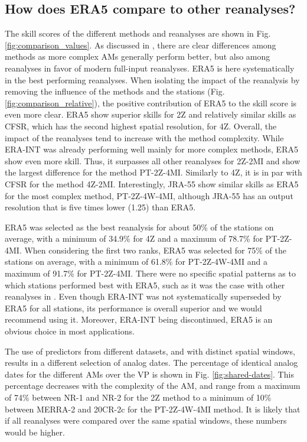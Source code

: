 \documentclass[alpha-refs]{wiley-article}
\begin{document}
\subsection{How does ERA5 compare to other reanalyses?}
\label{sec:results_skill}

The skill scores of the different methods and reanalyses are shown in Fig. \ref{fig:comparison_values}. As discussed in \citet{Horton2018b}, there are clear differences among methods as more complex AMs generally perform better, but also among reanalyses in favor of modern full-input reanalyses. ERA5 is here systematically in the best performing reanalyses. When isolating the impact of the reanalysis by removing the influence of the methods and the stations (Fig. \ref{fig:comparison_relative}), the positive contribution of ERA5 to the skill score is even more clear. ERA5 show superior skills for 2Z and relatively similar skills as CFSR, which has the second highest spatial resolution, for 4Z. Overall, the impact of the reanalyses tend to increase with the method complexity. While ERA-INT was already performing well mainly for more complex methods, ERA5 show even more skill. Thus, it surpasses all other reanalyses for 2Z-2MI and show the largest difference for the method PT-2Z-4MI. Similarly to 4Z, it is in par with CFSR for the method 4Z-2MI. Interestingly, JRA-55 show similar skills as ERA5 for the most complex method, PT-2Z-4W-4MI, although JRA-55 has an output resolution that is five times lower (1.25\degree) than ERA5.

ERA5 was selected as the best reanalysis for about 50\% of the stations on average, with a minimum of 34.9\% for 4Z and a maximum of 78.7\% for PT-2Z-4MI. When considering the first two ranks, ERA5 was selected for 75\% of the stations on average, with a minimum of 61.8\% for PT-2Z-4W-4MI and a maximum of 91.7\% for PT-2Z-4MI. There were no specific spatial patterns as to which stations performed best with ERA5, such as it was the case with other reanalyses in \citet{Horton2018b}. Even though ERA-INT was not systematically superseded by ERA5 for all stations, its performance is overall superior and we would recommend using it. Moreover, ERA-INT being discontinued, ERA5 is an obvious choice in most applications.

The use of predictors from different datasets, and with distinct spatial windows, results in a different selection of analog dates. The percentage of identical analog dates for the different AMs over the VP is shown in Fig. \ref{fig:shared-dates}. This percentage decreases with the complexity of the AM, and range from a maximum of 74\% between NR-1 and NR-2 for the 2Z method to a minimum of 10\% between MERRA-2 and 20CR-2c for the PT-2Z-4W-4MI method. It is likely that if all reanalyses were compared over the same spatial windows, these numbers would be higher.
\end{document}
